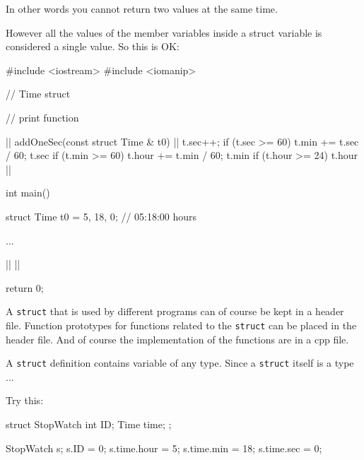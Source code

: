 \begin{center}
\begin{center}
In other words you cannot return two values at the same time.

However all the values of the member variables inside a struct variable is
considered a single value. So this is OK:

\begin{consolethree}[escapeinside=||]
#include <iostream>
#include <iomanip>

// Time struct

// print function

|| addOneSec(const struct Time & t0)
{
  ||
  t.sec++;
  if (t.sec >= 60)
  {
    t.min += t.sec / 60;
    t.sec %
    if (t.min >= 60)
    {
      t.hour += t.min / 60;
      t.min %
      if (t.hour >= 24)
      {
        t.hour %
      }
    }
  }
  ||
}

int main()
{
  struct Time t0 = {5, 18, 0}; // 05:18:00 hours

  ...

  ||
  ||

  return 0;
}
\end{consolethree}





\newpage{}

A \texttt{struct} that is used by different programs can of course be kept in a
header file. Function prototypes for functions related to the \texttt{struct} can
be placed in the header file. And of course the implementation of the
functions are in a cpp file.



\newpage{}

A \texttt{struct} definition contains variable of any type. Since a \texttt{struct} itself
is a type ... 

Try this:

\begin{consolethree}[escapeinside=||]
struct StopWatch
{
    int ID;
    Time time;
};

StopWatch s;
s.ID = 0;
s.time.hour = 5;
s.time.min = 18;
s.time.sec = 0;
\end{consolethree}


\end{center}
\end{center}
